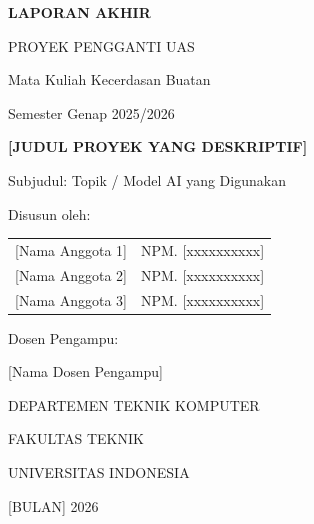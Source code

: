 \documentclass[11pt,a4paper,oneside]{report}
\begin{document}
\begin{titlepage}
\centering
\vspace*{1cm}

{\Large\bfseries LAPORAN AKHIR \par}
{\large PROYEK PENGGANTI UAS \par}
\vspace{0.3cm}
{\large Mata Kuliah Kecerdasan Buatan \par}
{\large Semester Genap 2025/2026 \par}

\vspace{2cm}


\vspace{1.5cm}

{\LARGE\bfseries [JUDUL PROYEK YANG DESKRIPTIF] \par}
\vspace{0.5cm}
{\large Subjudul: Topik / Model AI yang Digunakan \par}

\vspace{2.5cm}

{\large Disusun oleh: \par}
\vspace{0.5cm}
\begin{tabular}{rl}
{[Nama Anggota 1]} & NPM. [xxxxxxxxxx] \\
{[Nama Anggota 2]} & NPM. [xxxxxxxxxx] \\
{[Nama Anggota 3]} & NPM. [xxxxxxxxxx] \\
\end{tabular}

\vspace{2cm}

{\large Dosen Pengampu: \par}
{\large [Nama Dosen Pengampu] \par}

\vfill

{\large DEPARTEMEN TEKNIK KOMPUTER \par}
{\large FAKULTAS TEKNIK \par}
{\large UNIVERSITAS INDONESIA \par}
{\large [BULAN] 2026 \par}
\end{titlepage}
\end{document}

